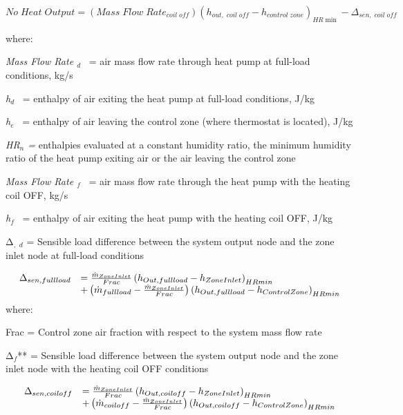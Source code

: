 \begin{equation}
No\;Heat\;Output = (Mass\;Flow\;Rat{e_{coil\;off}}){({h_{out,\;coil\;off}} - {h_{control\;zone}})_{HR\min }} - {\Delta_{sen,\;coil\;off}}
\end{equation}

where:

\emph{Mass Flow Rate \(_{d}\)}~ = air mass flow rate through heat pump at full-load conditions, kg/s

\emph{h\(_{d}\)}~ = enthalpy of air exiting the heat pump at full-load conditions, J/kg

\emph{h\(_{e}\)}~ = enthalpy of air leaving the control zone (where thermostat is located), J/kg

\emph{HR\(_{n}\) =} enthalpies evaluated at a constant humidity ratio, the minimum humidity ratio of the heat pump exiting air or the air leaving the control zone

\emph{Mass Flow Rate \(_{f}\)}~ = air mass flow rate through the heat pump with the heating coil OFF, kg/s

\emph{h\(_{f}\)}~ = enthalpy of air exiting the heat pump with the heating coil OFF, J/kg

Δ\(_{,}\) \emph{\(_{d}\)} = Sensible load difference between the system output node and the zone inlet node at full-load conditions

\begin{equation}
  \begin{array}{rl}
    \Delta_{sen,full load} &= \frac{\dot{m}_{ZoneInlet}}{Frac} \PB{h_{Out,full load} - h_{ZoneInlet}}_{HRmin} \\
                           &+ \PB{\dot{m}_{full load} - \frac{\dot{m}_{ZoneInlet}}{Frac}} \PB{h_{Out,full load} - h_{ControlZone}}_{HRmin}
  \end{array}
\end{equation}
where:

Frac = Control zone air fraction with respect to the system mass flow rate

Δ\(_{f}\)** = Sensible load difference between the system output node and the zone inlet node with the heating coil OFF conditions

\begin{equation}
  \begin{array}{rl}
    \Delta_{sen,coil off} &= \frac{\dot{m}_{ZoneInlet}}{Frac} \PB{h_{Out,coil off} - h_{ZoneInlet}}_{HRmin} \\
                           &+ \PB{\dot{m}_{coil off} - \frac{\dot{m}_{ZoneInlet}}{Frac}} \PB{h_{Out,coil off} - h_{ControlZone}}_{HRmin}
  \end{array}
\end{equation}

